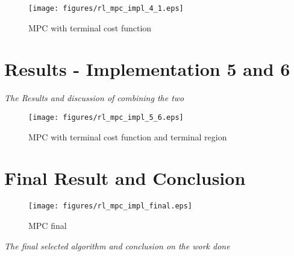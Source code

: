 \begin{figure}[H]
	\centering
	\texttt{[image: figures/rl\_mpc\_impl\_4\_1.eps]}
	\caption{MPC with terminal cost function}
	\label{fig:rlmpc-impl4-1}
\end{figure}

\section{Results - Implementation 5 and 6}
\emph{The Results and discussion of combining the two}

\begin{figure}[H]
	\centering
	\texttt{[image: figures/rl\_mpc\_impl\_5\_6.eps]}
	\caption{MPC with terminal cost function and terminal region}
	\label{fig:rlmpc-impl5-6}
\end{figure}


\section{Final Result and Conclusion}

\begin{figure}[H]
	\centering
	\texttt{[image: figures/rl\_mpc\_impl\_final.eps]}
	\caption{MPC final }
	\label{fig:rlmpc-final}
\end{figure}
\emph{The final selected algorithm and conclusion on the work done}

